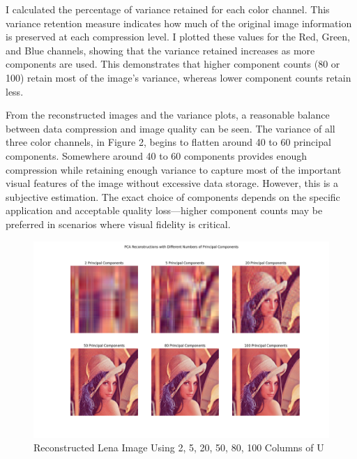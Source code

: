 \documentclass[11pt]{article}
\begin{document}
I calculated the percentage of variance retained for each color channel. This variance retention measure indicates how much of the original image information is preserved at each compression level. 
I plotted these values for the Red, Green, and Blue channels, showing that the variance retained increases as more components are used. 
This demonstrates that higher component counts (80 or 100) retain most of the image’s variance, whereas lower component counts retain less.

From the reconstructed images and the variance plots, a reasonable balance between data compression and image quality can be seen. 
The variance of all three color channels, in Figure 2, begins to flatten around 40 to 60 principal components. Somewhere around 40 to 60 components provides enough compression while retaining enough variance to capture most of the important 
visual features of the image without excessive data storage. 
However, this is a subjective estimation. The exact choice of components depends on the specific application and acceptable quality loss—higher component counts may be preferred in scenarios where visual fidelity is critical.

\begin{figure}[htbp]
    	\centering
    	\includegraphics[width=\textwidth]{figures/hw3_1_1.png}
    	\caption{Reconstructed Lena Image Using 2, 5, 20, 50, 80, 100 Columns of U}
		\label{fig:reconstructed_lena}
\end{figure}
\end{document}
